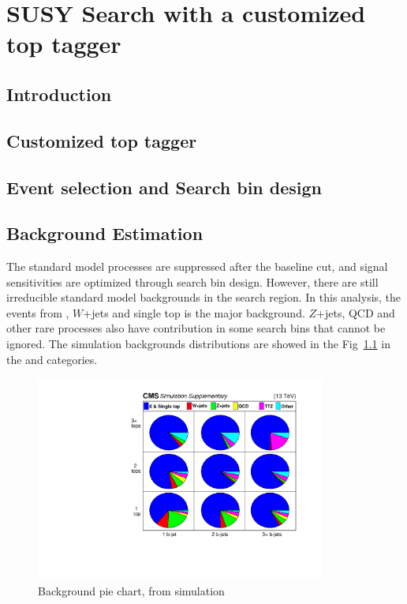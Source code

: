 \chapter{SUSY Search with a customized top tagger}

\clearpage
\section{Introduction}
\label{sec:c4intro}


\clearpage
\section{Customized top tagger}
\label{sec:c4tt}


\clearpage
\section{Event selection and Search bin design}
\label{sec:c4evssbd}


\clearpage
\section{Background Estimation}

The standard model processes are suppressed after the baseline cut, and signal sensitivities are optimized through search bin design. However, there are still irreducible standard model backgrounds in the search region. In this analysis, the events from \ttbar, $W$+jets and single top is the major background. $Z$+jets, QCD and other rare processes also have contribution in some search bins that cannot be ignored. The simulation backgrounds distributions are showed in the Fig~\ref{fig:c4bgmcpie} in the \ntops and \nbjets categories.

\begin{figure}[htbp]
 \begin{center}
  \includegraphics[width=0.85\textwidth]{figures/c4/c4_bg_mcpie.pdf}
 \end{center}
 \caption{Background pie chart, from simulation}
 \label{fig:c4bgmcpie}
\end{figure}

